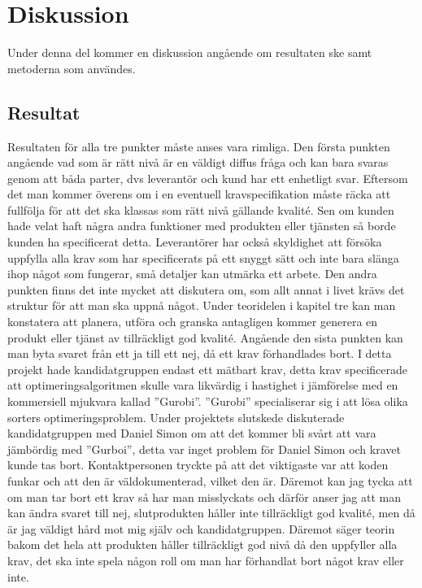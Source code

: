 \section{Diskussion}
Under denna del kommer en diskussion angående om resultaten ske samt metoderna som användes.
\subsection{Resultat}
Resultaten för alla tre punkter måste anses vara rimliga. Den första punkten angående vad som är rätt nivå är en väldigt diffus fråga och kan bara svaras genom att båda parter, dvs leverantör och kund har ett enhetligt svar. Eftersom det man kommer överens om i en eventuell kravspecifikation måste räcka att fullfölja för att det ska klassas som rätt nivå gällande kvalité. Sen om kunden hade velat haft några andra funktioner med produkten eller tjänsten så borde kunden ha specificerat detta. Leverantörer har också skyldighet att försöka uppfylla alla krav som har specificerats på ett snyggt sätt och inte bara slänga ihop något som fungerar, små detaljer kan utmärka ett arbete.
\newline
\newline
Den andra punkten finns det inte mycket att diskutera om, som allt annat i livet krävs det struktur för att man ska uppnå något. Under teoridelen i kapitel tre kan man konstatera att planera, utföra och granska antagligen kommer generera en produkt eller tjänst av tillräckligt god kvalité.
\newline
\newline
Angående den sista punkten kan man byta svaret från ett ja till ett nej, då ett krav förhandlades bort. I detta projekt hade kandidatgruppen endast ett mätbart krav, detta krav specificerade att optimeringsalgoritmen skulle vara likvärdig i hastighet i jämförelse med en kommersiell mjukvara kallad ''Gurobi''. ''Gurobi'' specialiserar sig i att lösa olika sorters optimeringsproblem. Under projektets slutskede diskuterade kandidatgruppen med Daniel Simon om att det kommer bli svårt att vara jämbördig med ''Gurboi'', detta var inget problem för Daniel Simon och kravet kunde tas bort. Kontaktpersonen tryckte på att det viktigaste var att koden funkar och att den är väldokumenterad, vilket den är. Däremot kan jag tycka att om man tar bort ett krav så har man misslyckats och därför anser jag att man kan ändra svaret till nej, slutprodukten håller inte tillräckligt god kvalité, men då är jag väldigt hård mot mig själv och kandidatgruppen. Däremot säger teorin bakom det hela att produkten håller tillräckligt god nivå då den uppfyller alla krav, det ska inte spela någon roll om man har förhandlat bort något krav eller inte.

